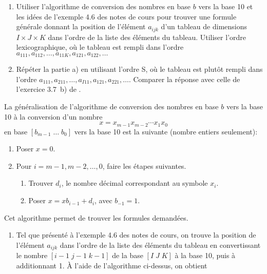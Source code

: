 \begin{exercice}
  \begin{enumerate}
  \item Utiliser l'algorithme de conversion des nombres en base $b$
    vers la base 10 et les idées de l'exemple 4.6 des notes de cours
    pour trouver une formule générale donnant la position de l'élément
    $a_{ijk}$ d'un tableau de dimensions $I \times J \times K$ dans
    l'ordre de la liste des éléments du tableau. Utiliser l'ordre
    lexicographique, où le tableau est rempli dans l'ordre $a_{111},
    a_{112}, \dots, a_{11K}, a_{121}, a_{122}, \dots$
  \item Répéter la partie a) en utilisant l'ordre S, où le tableau
    est plutôt rempli dans l'ordre $a_{111}, a_{211}, \dots, a_{I11},
    a_{121}, a_{221}, \dots$.  Comparer la réponse avec celle de
    l'exercice 3.7~b) de \cite{Goulet_intro_S}.
  \end{enumerate}
  \begin{sol}
    La généralisation de l'algorithme de conversion des nombres en
    base $b$ vers la base 10 à la conversion d'un nombre
    \begin{displaymath}
      x = x_{m-1}x_{m-2} \cdots x_1x_0
    \end{displaymath}
    en base $[b_{m-1}\; \dots\; b_0]$ vers la base 10 est la suivante
    (nombre entiers seulement):
    \begin{enumerate}[1.]
    \item Poser $x = 0$.
    \item Pour $i = m - 1, m - 2, \dots, 0$, faire les étapes suivantes.
      \begin{enumerate}
      \item Trouver $d_i$, le nombre décimal correspondant au symbole
        $x_i$.
      \item Poser $x = x b_{i - 1} + d_i$, avec $b_{-1} = 1$.
      \end{enumerate}
    \end{enumerate}
    Cet algorithme permet de trouver les formules demandées.
    \begin{enumerate}
    \item Tel que présenté à l'exemple 4.6 des notes de cours, on
      trouve la position de l'élément $a_{ijk}$ dans l'ordre de la
      liste des éléments du tableau en convertissant le nombre $[i -
      1\; j - 1\; k - 1]$ de la base $[I\; J\; K]$ à la base 10, puis
      à additionnant 1. À l'aide de l'algorithme ci-dessus, on obtient
      \begin{displaymath}

\end{displaymath}
\end{enumerate}
\end{sol}
\end{exercice}
